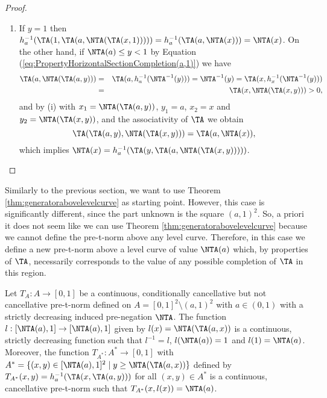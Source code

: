 \begin{proof}
\begin{enumerate}[label=(\roman*)]
\begin{itemize}
		\end{itemize}
		\item If $y=1$ then
		$h_a^{-1}(\TA(1,\TA(a,\NTA(\TA(x,1)))))=h_a^{-1}(\TA(a,\NTA(x)))=\NTA(x)$. On the other hand, if $\NTA(a) \leq y<1$ by Equation (\ref{eq:PropertyHorizontalSectionCompletion(a,1)}) we have
		\begin{eqnarray*}
			\TA(a,\NTA(\TA(a,y))) &=& \TA(a,h_a^{-1}(\NTA^{-1}(y))) = \NTA^{-1}(y) = \TA(x,h_x^{-1}(\NTA^{-1}(y))) \\
			&=&\TA(x,\NTA(\TA(x,y)))>0,
		\end{eqnarray*}
		and by (i) with $x_1 = \NTA(\TA(a,y))$, $y_1=a$, $x_2=x$ and $y_2 = \NTA(\TA(x,y))$, and the associativity of $\TA$ we obtain
		$$\TA(\TA(a,y),\NTA(\TA(x,y))) = \TA(a,\NTA(x)),$$
		which implies $\NTA(x) = h_a^{-1}(\TA(y,\TA(a,\NTA(\TA(x,y)))))$. \qedhere
	\end{enumerate}
\end{proof}

Similarly to the previous section, we want to use Theorem \ref{thm:generatorabovelevelcurve} as starting point. However, this case is significantly different, since the part unknown is the square $(a,1)^2$. So, a priori it does not seem like we can use Theorem \ref{thm:generatorabovelevelcurve} because we cannot define the pre-t-norm above any level curve.  Therefore, in this case we define a new pre-t-norm above a level curve of value $\NTA(a)$ which, by properties of $\TA$, necessarily corresponds to the value of any possible completion of $\TA$ in this region.

\begin{lemma}\label{lem:TAStarCase(a,1)}
	Let $T_A: A \to [0,1]$ be a continuous, conditionally cancellative but not cancellative pre-t-norm defined on $A=[0,1]^2 \setminus (a,1)^2$ with $a \in (0,1)$ with a strictly decreasing induced pre-negation $\NTA$. The function $l:[\NTA(a),1] \to [\NTA(a),1]$ given by $l(x)=\NTA(\TA(a,x))$ is a continuous, strictly decreasing function such that $l^{-1}=l$, $l(\NTA(a))=1$ and $l(1)=\NTA(a)$. Moreover, the function $T_{A^*}:A^* \to [0,1]$ with $A^* = \{(x,y) \in [\NTA(a),1]^2 \mid y \geq \NTA(\TA(a,x))\}$ defined by $T_{A^*}(x,y)=h_a^{-1}(\TA(x,\TA(a,y)))$ for all $(x,y) \in A^*$ is a continuous, cancellative pre-t-norm such that $T_{A^*}(x,l(x))=\NTA(a)$.
\end{lemma}

